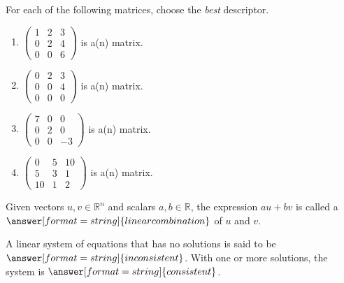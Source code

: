\documentclass{ximera}
\begin{document}
\begin{question}
For each of the following matrices, choose the {\em best} descriptor.  
\begin{enumerate}
\item $\left(\begin{array}{rrr} 1 & 2 & 3\\ 0 & 2 & 4\\ 0 & 0 & 6\end{array}\right)$ is a(n) 
 matrix.  
\item $\left(\begin{array}{rrr} 0 & 2 & 3\\ 0 & 0 & 4\\ 0 & 0 & 0\end{array}\right)$ is a(n)
 matrix.  
\item $\left(\begin{array}{rrr} 7 & 0 & 0\\ 0 & 2 & 0\\ 0 & 0 & -3\end{array}\right)$ is a(n) 
 matrix.  
\item $\left(\begin{array}{rrr} 0 & 5 & 10\\ 5 & 3 & 1\\ 10 & 1 & 2\end{array}\right)$ is a(n) 
 matrix.  
\end{enumerate}
\end{question}

\begin{question}
Given vectors $u, v\in {\mathbb R^n}$ and scalars $a, b \in {\mathbb R}$, the expression $au+bv$ is called a $\answer[format=string]{linear combination}$ of $u$ and $v$. 
\end{question}

\begin{question}
A linear system of equations that has no solutions is said to be $\answer[format=string]{inconsistent}$.  With one or more solutions, the system is $\answer[format=string]{consistent}$. 
\end{question} 
\end{document}
